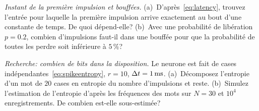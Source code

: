 \begin{exercise}[\lvlA]
\label{ex:04:6}
\emph{Instant de la première impulsion et bouffées.} (a)~D'après~\eqref{eq:latency}, trouvez l'entrée pour laquelle la première impulsion arrive exactement au bout d'une constante de temps. De quoi dépend-elle? (b)~Avec une probabilité de libération $p=0.2$, combien d'impulsions faut-il dans une bouffée pour que la probabilité de toutes les perdre soit inférieure à $5\,\%$?
\end{exercise}

\begin{exercise}[\lvlC]
\label{ex:04:7}
\emph{Recherche: combien de bits dans la disposition.} Le neurone est fait de cases indépendantes~\eqref{eq:spikeentropy}, $r=10$, $\Delta t=1\,\text{ms}$. (a)~Décomposez l'entropie d'un \og mot\fg{} de $20$ cases en entropie du nombre d'impulsions et reste. (b)~Simulez l'estimation de l'entropie d'après les fréquences des mots sur $N=30$ et $10^4$ enregistrements. De combien est-elle sous-estimée?
\end{exercise}
